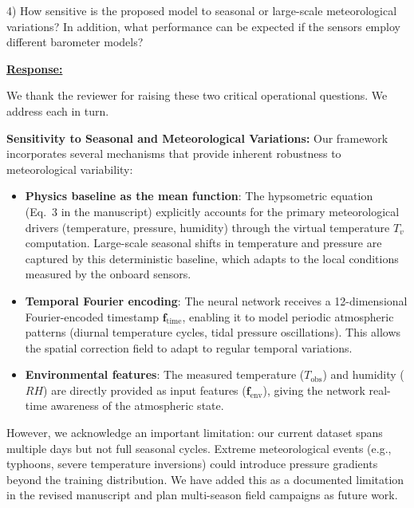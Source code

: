\newpage

\begin{cmttwo}{}{}
4) How sensitive is the proposed model to seasonal or large-scale meteorological variations? In addition, what performance can be expected if the sensors employ different barometer models?

\end{cmttwo}
\vspace{0.1cm}
\noindent
\underline{\textbf{Response:}}
\vspace{0.2cm}

We thank the reviewer for raising these two critical operational questions. We address each in turn.

\textbf{Sensitivity to Seasonal and Meteorological Variations:}
Our framework incorporates several mechanisms that provide inherent robustness to meteorological variability:
\begin{itemize}
    \item \textbf{Physics baseline as the mean function}: The hypsometric equation (Eq.~3 in the manuscript) explicitly accounts for the primary meteorological drivers (temperature, pressure, humidity) through the virtual temperature $T_v$ computation. Large-scale seasonal shifts in temperature and pressure are captured by this deterministic baseline, which adapts to the local conditions measured by the onboard sensors.
    \item \textbf{Temporal Fourier encoding}: The neural network receives a 12-dimensional Fourier-encoded timestamp $\mathbf{f}_{\text{time}}$, enabling it to model periodic atmospheric patterns (diurnal temperature cycles, tidal pressure oscillations). This allows the spatial correction field to adapt to regular temporal variations.
    \item \textbf{Environmental features}: The measured temperature ($T_{\text{obs}}$) and humidity ($RH$) are directly provided as input features ($\mathbf{f}_{\text{env}}$), giving the network real-time awareness of the atmospheric state.
\end{itemize}

However, we acknowledge an important limitation: our current dataset spans multiple days but not full seasonal cycles. Extreme meteorological events (e.g., typhoons, severe temperature inversions) could introduce pressure gradients beyond the training distribution. We have added this as a documented limitation in the revised manuscript and plan multi-season field campaigns as future work.


